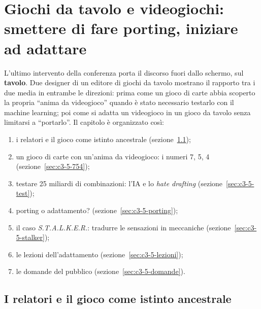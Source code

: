 
\chapter[Giochi da tavolo e videogiochi]{Giochi da tavolo e videogiochi: smettere
di fare porting, iniziare ad adattare}
\label{cap:c3-5-giochi-da-tavolo}

L'ultimo intervento della conferenza porta il discorso fuori dallo schermo, sul
\textbf{tavolo}. Due designer di un editore di giochi da tavolo mostrano il
rapporto tra i due media in entrambe le direzioni: prima come un gioco di carte
abbia scoperto la propria ``anima da videogioco'' quando è stato necessario
testarlo con il machine learning; poi come si adatta un videogioco in un gioco da
tavolo senza limitarsi a ``portarlo''. Il capitolo è organizzato così:
\begin{enumerate}
  \item i relatori e il gioco come istinto ancestrale
        (sezione~\ref{sec:c3-5-relatori});
  \item un gioco di carte con un'anima da videogioco: i numeri 7, 5, 4
        (sezione~\ref{sec:c3-5-754});
  \item testare 25 miliardi di combinazioni: l'IA e lo \emph{hate drafting}
        (sezione~\ref{sec:c3-5-test});
  \item porting o adattamento? (sezione~\ref{sec:c3-5-porting});
  \item il caso \emph{S.T.A.L.K.E.R.}: tradurre le sensazioni in meccaniche
        (sezione~\ref{sec:c3-5-stalker});
  \item le lezioni dell'adattamento (sezione~\ref{sec:c3-5-lezioni});
  \item le domande del pubblico (sezione~\ref{sec:c3-5-domande}).
\end{enumerate}

\section{I relatori e il gioco come istinto ancestrale}
\label{sec:c3-5-relatori}

